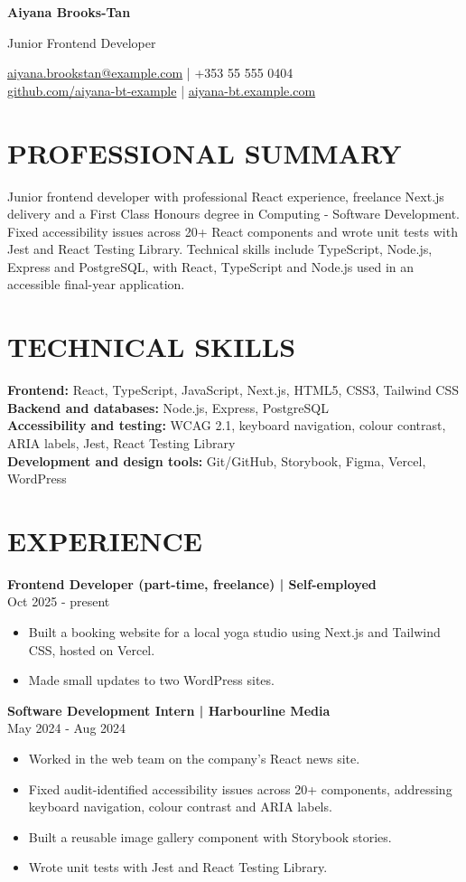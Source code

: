 \documentclass[11pt,a4paper]{article}
\newcommand{\cvsection}[1]{\section*{#1}}
\begin{document}
{\LARGE\bfseries\color{primarycolor} Aiyana Brooks-Tan}\par
{\large\color{accentcolor} Junior Frontend Developer}\par
\href{mailto:aiyana.brookstan@example.com}{aiyana.brookstan@example.com} | +353 55 555 0404\\
\href{https://github.com/aiyana-bt-example}{github.com/aiyana-bt-example} | \href{https://aiyana-bt.example.com}{aiyana-bt.example.com}

\cvsection{PROFESSIONAL SUMMARY}
Junior frontend developer with professional React experience, freelance Next.js delivery and a First Class Honours degree in Computing - Software Development. Fixed accessibility issues across 20+ React components and wrote unit tests with Jest and React Testing Library. Technical skills include TypeScript, Node.js, Express and PostgreSQL, with React, TypeScript and Node.js used in an accessible final-year application.

\cvsection{TECHNICAL SKILLS}
\textbf{Frontend:} React, TypeScript, JavaScript, Next.js, HTML5, CSS3, Tailwind CSS\\
\textbf{Backend and databases:} Node.js, Express, PostgreSQL\\
\textbf{Accessibility and testing:} WCAG 2.1, keyboard navigation, colour contrast, ARIA labels, Jest, React Testing Library\\
\textbf{Development and design tools:} Git/GitHub, Storybook, Figma, Vercel, WordPress

\cvsection{EXPERIENCE}
\textbf{Frontend Developer (part-time, freelance) | Self-employed}\\
Oct 2025 - present
\begin{itemize}
\item Built a booking website for a local yoga studio using Next.js and Tailwind CSS, hosted on Vercel.
\item Made small updates to two WordPress sites.
\end{itemize}

\textbf{Software Development Intern | Harbourline Media}\\
May 2024 - Aug 2024
\begin{itemize}
\item Worked in the web team on the company's React news site.
\item Fixed audit-identified accessibility issues across 20+ components, addressing keyboard navigation, colour contrast and ARIA labels.
\item Built a reusable image gallery component with Storybook stories.
\item Wrote unit tests with Jest and React Testing Library.
\end{itemize}
\end{document}
